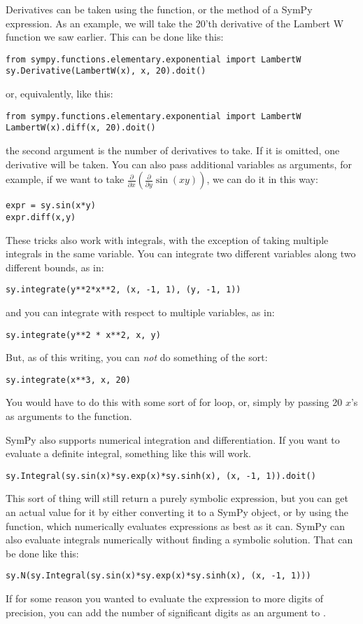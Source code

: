 Derivatives can be taken using the  function, or the  method of a SymPy expression.
As an example, we will take the 20'th derivative of the Lambert W function we saw earlier.
This can be done like this:
\begin{lstlisting}
from sympy.functions.elementary.exponential import LambertW
sy.Derivative(LambertW(x), x, 20).doit()
\end{lstlisting}
or, equivalently, like this:
\begin{lstlisting}
from sympy.functions.elementary.exponential import LambertW
LambertW(x).diff(x, 20).doit()
\end{lstlisting}
the second argument is the number of derivatives to take.
If it is omitted, one derivative will be taken.
You can also pass additional variables as arguments, for example, if we want to take $\frac{\partial}{\partial x} \left( \frac{\partial}{\partial y}\sin\left(x y\right)\right)$, we can do it in this way:
\begin{lstlisting}
expr = sy.sin(x*y)
expr.diff(x,y)
\end{lstlisting}
These tricks also work with integrals, with the exception of taking multiple integrals in the same variable.
You can integrate two different variables along two different bounds, as in:
\begin{lstlisting}
sy.integrate(y**2*x**2, (x, -1, 1), (y, -1, 1))
\end{lstlisting}
and you can integrate with respect to multiple variables, as in:
\begin{lstlisting}
sy.integrate(y**2 * x**2, x, y)
\end{lstlisting}
But, as of this writing, you can \emph{not} do something of the sort:
\begin{lstlisting}
sy.integrate(x**3, x, 20)
\end{lstlisting}
You would have to do this with some sort of for loop, or, simply by passing 20 $x$'s as arguments to the function.

SymPy also supports numerical integration and differentiation.
If you want to evaluate a definite integral, something like this will work.
\begin{lstlisting}
sy.Integral(sy.sin(x)*sy.exp(x)*sy.sinh(x), (x, -1, 1)).doit()
\end{lstlisting}
This sort of thing will still return a purely symbolic expression, but you can get an actual value for it by either converting it to a SymPy  object, or by using the  function, which numerically evaluates expressions as best as it can.
SymPy can also evaluate integrals numerically without finding a symbolic solution. That can be done like this:
\begin{lstlisting}
sy.N(sy.Integral(sy.sin(x)*sy.exp(x)*sy.sinh(x), (x, -1, 1)))
\end{lstlisting}
If for some reason you wanted to evaluate the expression to more digits of precision, you can add the number of significant digits as an argument to .


